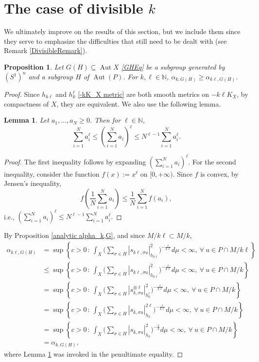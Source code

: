 \documentclass{article}
\newcommand{\NN}{{\mathbb N}}
\renewcommand{\>}{\rightarrow}
\DeclareMathOperator{\Aut}{Aut}
\theoremstyle{plain}
\newtheorem{proposition}[theorem]{Proposition}
\newtheorem{lemma}[theorem]{Lemma}
\theoremstyle{definition}
\def\lb#1{\label{#1}}
\def\disp{\displaystyle}
\begin{document}
\section{The case of divisible $k$}
\lb{DivisibleSec}

We ultimately improve on the results of this section, but we include
them since they serve to emphasize the difficulties that still need
to be dealt with (see Remark \ref{DivisibleRemark}).  

\begin{proposition}
\lb{weakmonotoneProp}
    Let $G(H)\subseteq\Aut X$ \eqref{GHEq} be a subgroup generated by $(S^1)^n$ and a subgroup $H$ of $\Aut(P)$. For $k,\ell\in\NN$, $\alpha_{k,G(H)}\geq\alpha_{k\ell,G(H)}$.
\end{proposition}
\begin{proof}
    Since $h_{k\ell}$ and $h_k^\ell$ \eqref{-kK_X metric} are both smooth metrics on $-k\ell K_X$, by compactness of $X$, they are equivalent. We also use the following lemma.
    \begin{lemma}
\lb{xlLemma}
        Let $a_1,\ldots,a_N\geq0$. Then for $\ell\in\NN$,
        $$
            \sum_{i=1}^Na_i^\ell\leq\left(\sum_{i=1}^Na_i\right)^\ell\leq N^{\ell-1}\sum_{i=1}^Na_i^\ell.
        $$
    \end{lemma}
    \begin{proof}
        The first inequality follows by expanding $(\sum_{i=1}^Na_i)^\ell$. For the second inequality, consider the function $f(x):=x^\ell$ on $[0,+\infty)$. Since $f$ is convex, by Jensen's inequality,
        $$
            f\left(\frac{1}{N}\sum_{i=1}^Na_i\right)\leq\frac{1}{N}\sum_{i=1}^Nf\left(a_i\right),
        $$
        i.e.,
        $
        \disp    \left(\sum_{i=1}^Na_i\right)^\ell\leq N^{\ell-1}\sum_{i=1}^Na_i^\ell.
        $
    \end{proof}
    By Proposition \ref{analytic alpha_k,G}, and since $M/k\ell \subset M/k$,
    \begin{align*}
        \alpha_{k\ell,G(H)}&=\sup\left\{c>0\,:\,\int_X\Big(\sum_{\sigma\in H}\left|s_{k\ell,\sigma u}\right|_{h_{k\ell}}^2\Big)^{-\frac{c}{k\ell}}d\mu<\infty,~\forall~u\in P\cap M/k\ell\right\}\\
        &\leq\sup\left\{c>0\,:\,\int_X\Big(\sum_{\sigma\in H}\left|s_{k\ell,\sigma u}\right|_{h_{k\ell}}^2\Big)^{-\frac{c}{k\ell}}d\mu<\infty,~\forall~u\in P\cap M/k\right\}\\
        &=\sup\left\{c>0\,:\,\int_X\Big(\sum_{\sigma\in H}\left|s_{k,\sigma u}^{\otimes\ell}\right|_{h_k^\ell}^2\Big)^{-\frac{c}{k\ell}}d\mu<\infty,~\forall~u\in P\cap M/k\right\}\\
        &=\sup\left\{c>0\,:\,\int_X\Big(\sum_{\sigma\in H}\left|s_{k,\sigma u}\right|_{h_k}^{2\ell}\Big)^{-\frac{c}{k\ell}}d\mu<\infty,~\forall~u\in P\cap M/k\right\}\\
        &=\sup\left\{c>0\,:\,\int_X\Big(\sum_{\sigma\in H}\left|s_{k,\sigma u}\right|_{h_k}^2\Big)^{-\frac{c}{k}}d\mu<\infty,~\forall~u\in P\cap M/k\right\}\\
        &=\alpha_{k,G(H)},
    \end{align*}
    where Lemma \ref{xlLemma} was invoked in the penultimate equality.
\end{proof}
\end{document}
